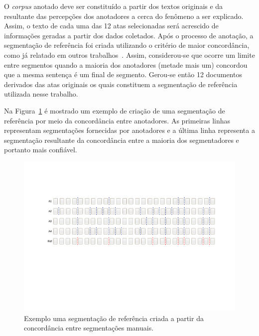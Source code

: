 O \textit{corpus} anotado deve ser constituído a partir dos textos originais e da resultante das percepções dos anotadores a cerca do fenômeno a ser explicado. Assim, o texto de cada uma das 12 atas selecionadas será acrescido de informações geradas a partir dos dados coletados. Após o processo de anotação, a segmentação de referência foi criada utilizando o critério de maior concordância, como já relatado em outros trabalhos~\cite{Hearst1997, Cardoso2017, Kazantseva2012, Passonneau1997, Galley2003}. Assim, considerou-se que ocorre um limite entre segmentos quando a maioria dos anotadores (metade mais um) concordou que a mesma sentença é um final de segmento. Gerou-se então 12 documentos derivados das atas originais os quais constituem a segmentação de referência utilizada nesse trabalho.

Na Figura~\ref{fig:concordanciasegref} é mostrado um exemplo de criação de uma segmentação de referência por meio da concordância entre anotadores. As primeiras linhas representam segmentações fornecidas por anotadores e a última linha representa a segmentação resultante da concordância entre a maioria dos segmentadores e portanto mais confiável. 

  \begin{center}
	\begin{figure}[h!]

	\includegraphics[trim={ 95 255 75 140 },clip,page=1,width=\textwidth]{conteudo/capitulos/figs/segmentacao-referencia.pdf}

	\caption{Exemplo uma segmentação de referência criada a partir da concordância entre segmentações manuais.}
	\label{fig:concordanciasegref}
	\end{figure}
\end{center}







